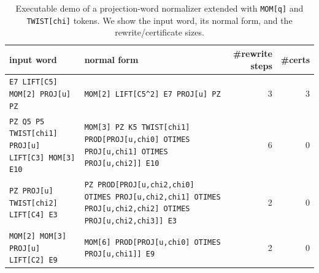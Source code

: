 \begin{table}[H]
\centering
\scriptsize
\setlength{\tabcolsep}{6pt}
\caption{Executable demo of a projection-word normalizer extended with \texttt{MOM[q]} and \texttt{TWIST[chi]} tokens. We show the input word, its normal form, and the rewrite/certificate sizes.}
\label{tab:pom_projword_mom_twist_normalizer_demo}
\begin{tabular}{l l r r}
\toprule
input word & normal form & \#rewrite steps & \#certs\\
\midrule
\texttt{E7 LIFT[C5] MOM[2] PROJ[u] PZ} & \texttt{MOM[2] LIFT[C5\^{}2] E7 PROJ[u] PZ} & 3 & 3\\
\texttt{PZ Q5 P5 TWIST[chi1] PROJ[u] LIFT[C3] MOM[3] E10} & \texttt{MOM[3] PZ K5 TWIST[chi1] PROD[PROJ[u,chi0] OTIMES PROJ[u,chi1] OTIMES PROJ[u,chi2]] E10} & 6 & 0\\
\texttt{PZ PROJ[u] TWIST[chi2] LIFT[C4] E3} & \texttt{PZ PROD[PROJ[u,chi2,chi0] OTIMES PROJ[u,chi2,chi1] OTIMES PROJ[u,chi2,chi2] OTIMES PROJ[u,chi2,chi3]] E3} & 2 & 0\\
\texttt{MOM[2] MOM[3] PROJ[u] LIFT[C2] E9} & \texttt{MOM[6] PROD[PROJ[u,chi0] OTIMES PROJ[u,chi1]] E9} & 2 & 0\\
\bottomrule
\end{tabular}
\end{table}
